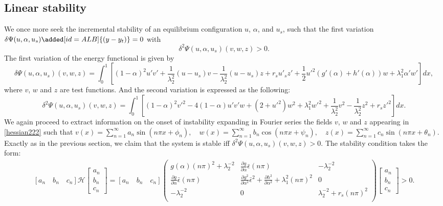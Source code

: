 \subsection{Linear stability}
We once more seek the incremental stability of an equilibrium configuration $u$, $\alpha$, and $u_s$, such that the first variation $\delta \Psi(u,\alpha,u_s)\added[id=ALB]{(y-y_t)}=0$  with
\begin{equation*}
\delta^2 \Psi(u,\alpha,u_s)(v,w,z)>0.
\end{equation*}
The first variation of the energy functional is given by
\begin{equation}
\delta \Psi(u,\alpha,u_s)(v,w,z)=\int_0^1 [(1-\alpha)^2u'v'+\frac{1}{\lambda_2^2} (u-u_s) v-\frac{1}{\lambda_2^2} (u-u_s) z+r_su'_sz'+\frac{1}{2}u'^2 (g'(\alpha)+h'(\alpha))w+\lambda_1^2\alpha'w' ]dx,\label{firstvar}
\end{equation}
where $v$, $w$ and $z$ are  test functions. And the second variation is  expressed as the  following:
\begin{equation}
\delta^2 \Psi(u,\alpha,u_s)(v,w,z)=\int_0^1 [(1-\alpha)^2v'^2 
- 4(1-\alpha)u' v'w+(2+ u'^2)w^2+\lambda_1^2w'^2 +\frac{1}{\lambda_2^2} v^2 -\frac{1}{\lambda_2^2} z^2+r_sz'^2]dx.\label{hessian222}\end{equation}
We again proceed to extract information on the onset of instability expanding in Fourier series the fields $v$, $w$ and $z$ appearing in \eqref{hessian222} such that $v(x)=\sum_{n=1}^{\infty} a_{n} \sin \left(n \pi x+\phi_{n}\right), \quad w(x)=\sum_{n=1}^{\infty} b_{n} \cos \left(n \pi x+\psi_{n}\right),\quad z(x)=\sum_{n=1}^{\infty} c_{n} \sin \left(n \pi x+\theta_{n}\right)$. Exactly as in the previous section, we claim that the system is stable iff $\delta^2 \Psi(u,\alpha,u_s)(v,w,z)>0$. The stability condition  takes the form:
\begin{align}\left[ a_n \quad b_n \quad c_n  \right] \mathcal{H} \left[ \begin{array}{c} a_n \\ b_n  \\ c_n\end{array} \right]=\left[ a_n \quad b_n \quad c_n \right]\left(
\begin{array}{ccc}
g(\alpha)(n\pi)^2+\lambda_2^{-2}& \frac{\partial g}{\partial \alpha}\bar\epsilon(n\pi) &  -\lambda_2^{-2} \\
\frac{\partial g}{\partial \alpha}\bar\epsilon(n\pi) & \frac{\partial g^2}{\partial \alpha^2}\bar\epsilon^2+ \frac{\partial h^2}{\partial \alpha^2}+\lambda_1^2(n\pi)^2 & 0 \\
 -\lambda_2^{-2} & 0 & \lambda_2^{-2} +r_s(n\pi)^2\\
\end{array}
\right)\left[ \begin{array}{c} a_n \\ b_n \\c_n \end{array} \right]>0.\label{hessian3}\end{align}

